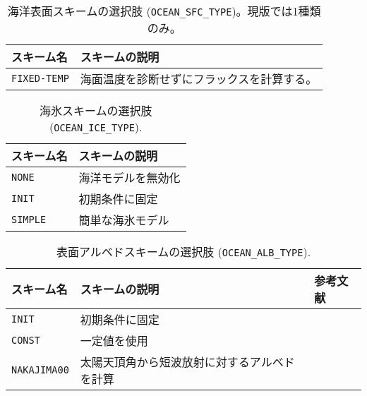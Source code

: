 \begin{table}[h]
\begin{center}
  \caption{海洋表面スキームの選択肢 (\texttt{OCEAN\_SFC\_TYPE})。現版では1種類のみ。}
  \label{tab:nml_ocean_sfc}
  \begin{tabularx}{150mm}{lX} \hline
    \rowcolor[gray]{0.9}  スキーム名 & スキームの説明 \\ \hline
      \verb|FIXED-TEMP| & 海面温度を診断せずにフラックスを計算する。\\
    \hline
  \end{tabularx}
\end{center}
\end{table}

\begin{table}[h]
\begin{center}
  \caption{海氷スキームの選択肢 (\texttt{OCEAN\_ICE\_TYPE}).}
  \label{tab:nml_ocean_ice}
  \begin{tabularx}{150mm}{lX} \hline
    \rowcolor[gray]{0.9}  スキーム名 & スキームの説明 \\ \hline
      \verb|NONE|   & 海洋モデルを無効化 \\
      \verb|INIT|   & 初期条件に固定 \\
      \verb|SIMPLE| & 簡単な海氷モデル \\
    \hline
  \end{tabularx}
\end{center}
\end{table}

\begin{table}[h]
\begin{center}
  \caption{表面アルベドスキームの選択肢 (\texttt{OCEAN\_ALB\_TYPE}).}
  \label{tab:nml_ocean_alb}
  \begin{tabularx}{150mm}{llX} \hline
    \rowcolor[gray]{0.9}  スキーム名 & スキームの説明 & 参考文献 \\ \hline
      \verb|INIT|       & 初期条件に固定 \\
      \verb|CONST|      & 一定値を使用 \\
      \verb|NAKAJIMA00| & 太陽天頂角から短波放射に対するアルベドを計算 & \citet{nakajima_2000} \\
    \hline
  \end{tabularx}
\end{center}
\end{table}

